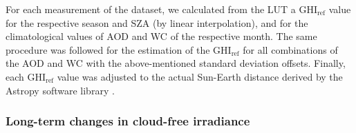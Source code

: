 \documentclass[preprint, 5p,
authoryear]{elsarticle} %
\begin{document}
For each measurement of the dataset, we calculated from the LUT a
\(\text{GHI}_\text{ref}\) value for the respective season and SZA (by
linear interpolation), and for the climatological values of AOD and WC
of the respective month. The same procedure was followed for the
estimation of the \(\text{GHI}_\text{ref}\) for all combinations of the
AOD and WC with the above-mentioned standard deviation offsets. Finally,
each \(\text{GHI}_\text{ref}\) value was adjusted to the actual
Sun-Earth distance derived by the Astropy software library
\citep{AstropyCollaboration2022}.

\hypertarget{long-term-changes-in-cloud-free-irradiance}{%
\subsubsection{Long-term changes in cloud-free
irradiance}\label{long-term-changes-in-cloud-free-irradiance}}
\end{document}
